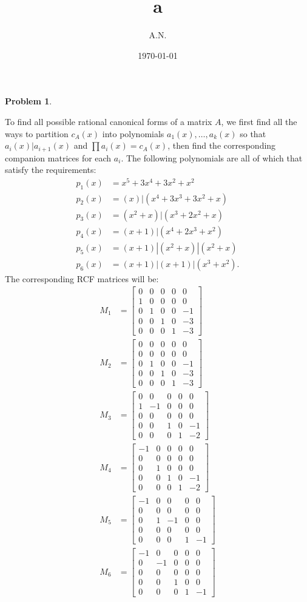 \documentclass[12pt, a4paper]{article}
\title{a}
\author{A.N.}
\date{\today}
\newtheorem{problem}{Problem}
\theoremstyle{definition}
\newcommand{\bmat}[1]{\begin{bmatrix}#1\end{bmatrix}}
\begin{document}
\begin{problem}
\end{problem}
To find all possible rational canonical forms of a matrix $A$, we first find all the ways to partition $c_A(x)$ into polynomials $a_1(x), \dots ,a_k(x)$ so that $a_i(x)|a_{i+1}(x)$ and $\prod a_i(x) = c_A(x)$, then find the corresponding companion matrices for each $a_i$. The following polynomials are all of which that satisfy the requirements: 
\begin{align*}
p_1(x) & = x^5+3x^4+3x^2+x^2
\\ p_2(x) & = (x)|(x^4+3x^3+3x^2+x)
\\ p_3(x) & = (x^2+x)|(x^3+2x^2+x)
\\ p_4(x) & = (x+1)|(x^4+2x^3+x^2)
\\ p_5(x) & = (x+1)|(x^2+x)|(x^2+x)
\\ p_6(x) & = (x+1)|(x+1)|(x^3+x^2).
\end{align*} 
The corresponding RCF matrices will be:
\begin{align*}
	M_1 &= \bmat{0&0 & 0&0&0\\ 1 & 0 & 0 & 0 &0\\0&1&0&0&-1\\0&0&1&0&-3\\0&0&0&1&-3 }
	\\ M_2& = \bmat{0&0&0&0&0 \\ 0&0&0&0&0\\ 0&1&0&0&-1\\ 0&0&1&0&-3\\0&0&0&1&-3 }
	\\ M_3 & = \bmat{0&0&0&0&0\\ 1&-1&0&0&0 \\ 0&0&0&0&0 \\ 0&0&1&0&-1 \\ 0&0&0&1&-2}
	\\ M_4 & = \bmat{-1&0&0&0&0 \\ 0&0&0&0&0 \\ 0&1&0&0&0\\ 0&0&1&0&-1 \\ 0&0&0&1&-2}
	\\ M_5 & = \bmat{-1&0&0&0&0 \\ 0&0&0&0&0 \\ 0&1&-1&0&0\\ 0&0&0&0&0 \\ 0&0&0&1&-1}
	\\ M_6 & = \bmat{-1 & 0&0&0&0 \\ 0&-1&0&0&0 \\ 0&0& 0&0&0 \\ 0&0&1&0&0 \\ 0&0&0&1&-1}
\end{align*}
\end{document}
